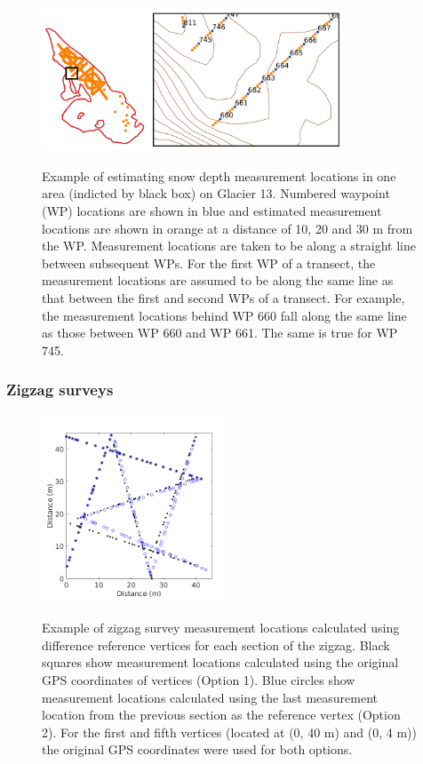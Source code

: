 \documentclass{sfuthesis}
\begin{document}
\begin{figure}[H]
	\centering
	\includegraphics[width = 0.8\textwidth]{transect_measure_locations.jpeg}\\
	\caption{Example of estimating snow depth measurement locations in one area (indicted by black box) on Glacier 13. Numbered waypoint (WP) locations are shown in blue and estimated measurement locations are shown in orange at a distance of 10, 20 and 30 m from the WP. Measurement locations are taken to be along a straight line between subsequent WPs. For the first WP of a transect, the measurement locations are assumed to be along the same line as that between the first and second WPs of a transect. For example, the measurement locations behind WP 660 fall along the same line as those between WP 660 and WP 661. The same is true for WP 745. }
	\label{fig:transect_measure_loc}
\end{figure}

\subsubsection{Zigzag surveys}

\begin{figure}
	\centering
	\includegraphics[width = 0.5\textwidth]{Zigzag_calOptions.png}\\
	\caption{Example of zigzag survey measurement locations calculated using difference reference vertices for each section of the zigzag. Black squares show measurement locations calculated using the original GPS coordinates of vertices (Option 1). Blue circles show measurement locations calculated using the last measurement location from the previous section as the reference vertex (Option 2). For the first and fifth vertices (located at (0, 40 m) and (0, 4 m)) the original GPS coordinates were used for both options. }
	\label{fig:zigzag_location_options}
\end{figure}
\end{document}
